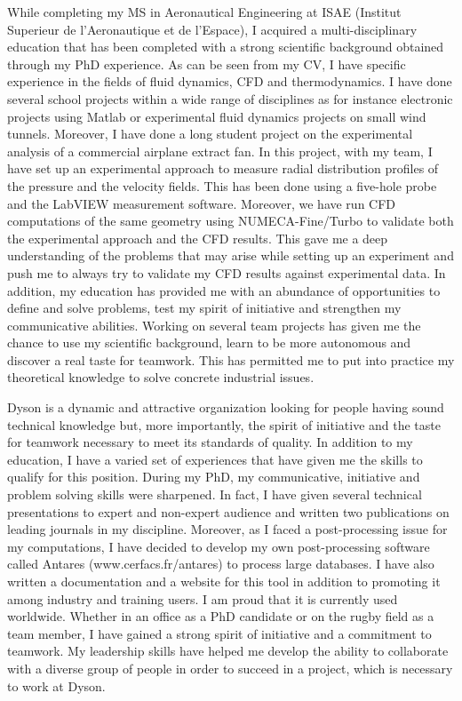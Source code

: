 \documentclass[10pt]{article}
\begin{document}
\noindent
While completing my MS in Aeronautical Engineering at ISAE (Institut Superieur de l’Aeronautique et de l’Espace), I acquired a multi-disciplinary education that has been completed with a strong scientific background obtained through my PhD experience. As can be seen from my CV, I have specific experience in the fields of fluid dynamics, CFD and thermodynamics. I have done several school projects within a wide range of disciplines as for instance electronic projects using Matlab or experimental fluid dynamics projects on small wind tunnels. Moreover, I have done a long student project on the experimental analysis of a commercial airplane extract fan. In this project, with my team, I have set up an experimental approach to measure radial distribution profiles of the pressure and the velocity fields. This has been done using a five-hole probe and the LabVIEW measurement software. Moreover, we have run CFD computations of the same geometry using NUMECA-Fine/Turbo to validate both the experimental approach and the CFD results. This gave me a deep understanding of the problems that may arise while setting up an experiment and push me to always try to validate my CFD results against experimental data. In addition, my education has provided me with an abundance of opportunities to define and solve problems, test my spirit of initiative and strengthen my communicative abilities. Working on several team projects has given me the chance to use my scientific background, learn to be more autonomous and discover a real taste for teamwork. This has permitted me to put into practice my theoretical knowledge to solve concrete industrial issues.
\newline

\noindent
Dyson is a dynamic and attractive organization looking for people having sound technical knowledge but, more importantly, the spirit of initiative and the taste for teamwork necessary to meet its standards of quality. In addition to my education, I have a varied set of experiences that have given me the skills to qualify for this position. During my PhD, my communicative, initiative and problem solving skills were sharpened. In fact, I have given several technical presentations to expert and non-expert audience and written two publications on leading journals in my discipline. Moreover, as I faced a post-processing issue for my computations, I have decided to develop my own post-processing software called Antares (www.cerfacs.fr/antares) to process large databases. I have also written a documentation and a website for this tool in addition to promoting it among industry and training users. I am proud that it is currently used worldwide. Whether in an office as a PhD candidate or on the rugby field as a team member, I have gained a strong spirit of initiative and a commitment to teamwork. My leadership skills have helped me develop the ability to collaborate with a diverse group of people in order to succeed in a project, which is necessary to work at Dyson.
\newline
\end{document}
